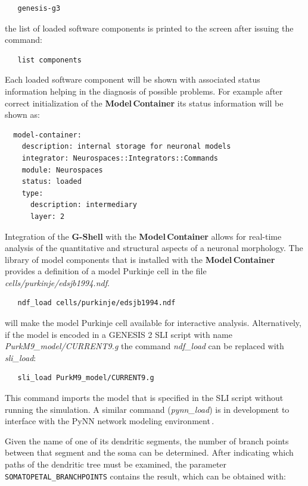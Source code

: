 \documentclass[12pt]{article}
\begin{document}
{\footnotesize
\begin{verbatim}
   genesis-g3
\end{verbatim}
}

the list of loaded software components is printed to the screen after
issuing the command:

{\footnotesize
\begin{verbatim}
   list components
\end{verbatim}
}

Each loaded software component will be shown with associated status
information helping in the diagnosis of possible problems.  For
example after correct initialization of the {\bf Model\,Container} its
status information will be shown as:

{\footnotesize
\begin{verbatim}
  model-container:
    description: internal storage for neuronal models
    integrator: Neurospaces::Integrators::Commands
    module: Neurospaces
    status: loaded
    type:
      description: intermediary
      layer: 2
\end{verbatim}
}

Integration of the {\bf G-Shell} with the {\bf Model\,Container}
allows for real-time analysis of the quantitative and structural
aspects of a neuronal morphology.  The library of model components
that is installed with the {\bf Model\,Container} provides a
definition of a model Purkinje cell in the file {\it
  cells/purkinje/edsjb1994.ndf}.  {\footnotesize
\begin{verbatim}
   ndf_load cells/purkinje/edsjb1994.ndf
\end{verbatim}
}
will make the model Purkinje cell available for interactive analysis.
Alternatively, if the model is encoded in a GENESIS 2 SLI script with
name {\it PurkM9\_model/CURRENT9.g} the command {\it ndf\_load} can be
replaced with {\it sli\_load}:

{\footnotesize
\begin{verbatim}
   sli_load PurkM9_model/CURRENT9.g
\end{verbatim}
}

This command imports the model that is specified in the SLI script
without running the simulation.  A similar command ({\it pynn\_load})
is in development to interface with the PyNN network modeling
environment\,\cite{andrew08:_pynn}.

Given the name of one of its dendritic segments, the number of branch
points between that segment and the soma can be determined. After
indicating which paths of the dendritic tree must be examined, the
parameter {\tt SOMATOPETAL\_BRANCHPOINTS} contains the result, which
can be obtained with:
\end{document}
